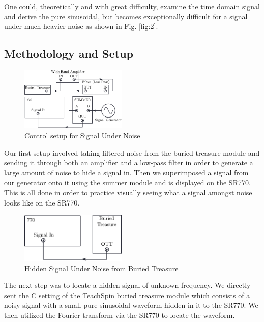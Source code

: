 \documentclass[prl,twocolumn,superscriptaddress,floatfix]{revtex4}
\begin{document}
One could, theoretically and with great difficulty, examine the time domain signal and derive the pure sinusoidal, but
becomes exceptionally difficult for a signal under much heavier noise as shown in Fig. \ref{fig:2}. 

\subsection{Methodology and Setup}
\begin{figure}[H]
    \includegraphics[width=0.45\textwidth]{exp1_1.pdf}
    \caption{Control setup for Signal Under Noise}
    \label{fig:exp1}
\end{figure}
Our first setup involved taking filtered noise from the buried treasure module and sending it through both an amplifier and a low-pass filter in order to generate a large amount of noise to hide a signal in. Then we superimposed a signal from our generator onto it using the summer module and is displayed on the SR770. This is all done in order to practice visually seeing what a signal amongst noise looks like on the SR770.
\begin{figure}[H]
    \includegraphics[width=0.45\textwidth]{exp1_2.pdf}
    \caption{Hidden Signal Under Noise from Buried Treasure}
    \label{fig:exp2}
\end{figure}
The next step was to locate a hidden signal of unknown frequency. We directly sent the C setting of the TeachSpin buried treasure module which consists of a noisy signal with a small pure sinusoidal waveform hidden in it to the SR770. We then utilized the Fourier transform via the SR770 to locate the waveform.
\end{document}
